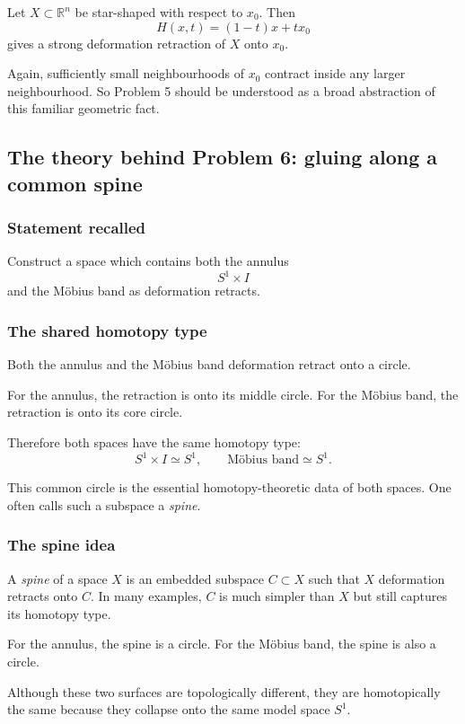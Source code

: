 \documentclass[12pt,a4paper]{article}
\theoremstyle{notespace}
\begin{document}
Let \(X\subset \mathbb{R}^n\) be star-shaped with respect to \(x_0\). Then
\[
H(x,t)=(1-t)x+tx_0
\]
gives a strong deformation retraction of \(X\) onto \(x_0\).

Again, sufficiently small neighbourhoods of \(x_0\) contract inside any larger neighbourhood. So Problem 5 should be understood as a broad abstraction of this familiar geometric fact.

\subsection{The theory behind Problem 6: gluing along a common spine}

\subsubsection{Statement recalled}

Construct a space which contains both the annulus
\[
S^1\times I
\]
and the Möbius band as deformation retracts.

\subsubsection{The shared homotopy type}

Both the annulus and the Möbius band deformation retract onto a circle.

For the annulus, the retraction is onto its middle circle. For the Möbius band, the retraction is onto its core circle.

Therefore both spaces have the same homotopy type:
\[
S^1\times I \simeq S^1,
\qquad
\text{Möbius band} \simeq S^1.
\]

This common circle is the essential homotopy-theoretic data of both spaces. One often calls such a subspace a \emph{spine}.

\subsubsection{The spine idea}

A \emph{spine} of a space \(X\) is an embedded subspace \(C\subset X\) such that \(X\) deformation retracts onto \(C\). In many examples, \(C\) is much simpler than \(X\) but still captures its homotopy type.

For the annulus, the spine is a circle. For the Möbius band, the spine is also a circle.

Although these two surfaces are topologically different, they are homotopically the same because they collapse onto the same model space \(S^1\).
\end{document}
